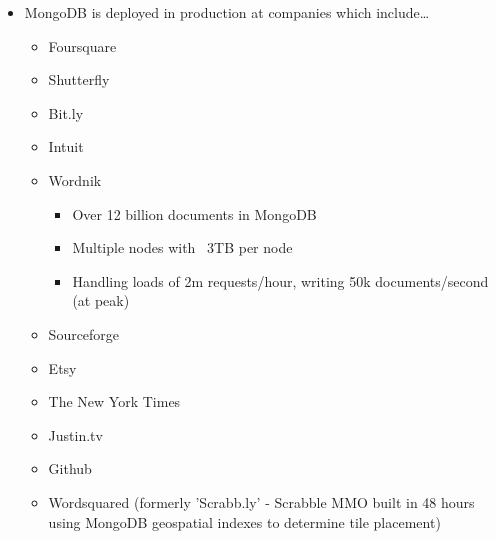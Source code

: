 \documentclass[xcolor=dvipsnames]{beamer}
\newenvironment{itemizeframe}
               {\begin{frame}\startitemizeframe} 
               {\stopitemizeframe\end{frame}}
\newcommand\startitemizeframe{\begin{itemize}} \newcommand\stopitemizeframe{\end{itemize}}
\begin{document}
\begin{itemizeframe}
    \frametitle{But is anyone actually *using* it?!?}
    \item MongoDB is deployed in production at companies which include\ldots
    \begin{itemize}
        \item Foursquare
        \item Shutterfly
        \item Bit.ly
        \item Intuit
        \item Wordnik
                \begin{itemize}
                    \item Over 12 billion documents in MongoDB
                    \item Multiple nodes with ~3TB per node
                    \item Handling loads of 2m requests/hour, writing 50k documents/second (at peak)
                \end{itemize}
        \item Sourceforge
        \item Etsy
        \item The New York Times
        \item Justin.tv
        \item Github
        \item Wordsquared (formerly 'Scrabb.ly' - Scrabble MMO built in 48 hours using MongoDB geospatial indexes to determine tile placement)
    \end{itemize}
\end{itemizeframe}
\end{document}
